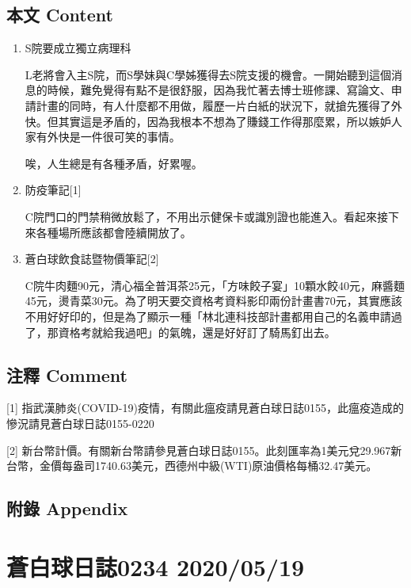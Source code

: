 \documentclass[a5paper, 11pt
]{book}
\begin{document}
\hypertarget{ux672cux6587-content-78}{%
\subsection{本文 Content}\label{ux672cux6587-content-78}}

\begin{enumerate}
\def\labelenumi{\arabic{enumi}.}
\item
  S院要成立獨立病理科

  L老將會入主S院，而S學妹與C學姊獲得去S院支援的機會。一開始聽到這個消息的時候，難免覺得有點不是很舒服，因為我忙著去博士班修課、寫論文、申請計畫的同時，有人什麼都不用做，履歷一片白紙的狀況下，就搶先獲得了外快。但其實這是矛盾的，因為我根本不想為了賺錢工作得那麼累，所以嫉妒人家有外快是一件很可笑的事情。

  唉，人生總是有各種矛盾，好累喔。
\item
  防疫筆記{[}1{]}

  C院門口的門禁稍微放鬆了，不用出示健保卡或識別證也能進入。看起來接下來各種場所應該都會陸續開放了。
\item
  蒼白球飲食誌暨物價筆記{[}2{]}

  C院牛肉麵90元，清心福全普洱茶25元，「方味餃子宴」10顆水餃40元，麻醬麵45元，燙青菜30元。為了明天要交資格考資料影印兩份計畫書70元，其實應該不用好好印的，但是為了顯示一種「林北連科技部計畫都用自己的名義申請過了，那資格考就給我過吧」的氣魄，還是好好訂了騎馬釘出去。
\end{enumerate}

\hypertarget{ux6ce8ux91cb-comment-78}{%
\subsection{注釋 Comment}\label{ux6ce8ux91cb-comment-78}}

{[}1{]}
指武漢肺炎(COVID-19)疫情，有關此瘟疫請見蒼白球日誌0155，此瘟疫造成的慘況請見蒼白球日誌0155-0220

{[}2{]}
新台幣計價。有關新台幣請參見蒼白球日誌0155。此刻匯率為1美元兌29.967新台幣，金價每盎司1740.63美元，西德州中級(WTI)原油價格每桶32.47美元。

\hypertarget{ux9644ux9304-appendix-78}{%
\subsection{附錄 Appendix}\label{ux9644ux9304-appendix-78}}

\hypertarget{ux84bcux767dux7403ux65e5ux8a8c0234-20200519}{%
\section{蒼白球日誌0234
2020/05/19}\label{ux84bcux767dux7403ux65e5ux8a8c0234-20200519}}
\end{document}
